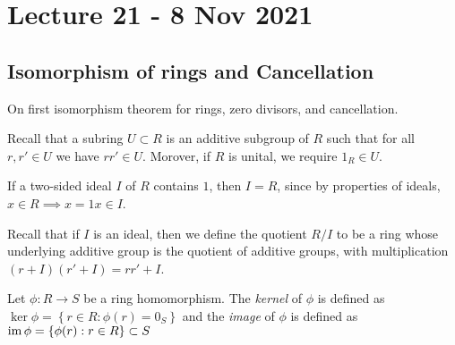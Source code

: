 \section{Lecture 21 - 8 Nov 2021}
\subsection{Isomorphism of rings and Cancellation}
On first isomorphism theorem for rings, zero divisors, and cancellation.

Recall that a subring $U\subset R$ is an additive subgroup of $R$ such that for all
$r,r'\in U$ we have $rr'\in U$. Morover, if $R$ is unital, we require $1_R\in U$. 


If a two-sided ideal $I$ of $R$ contains $1$, then $I = R$, since by properties of ideals, $x \in R \implies x = 1x \in I$. 

Recall that if $I$ is an ideal, then we define the quotient $R/I$ to be a ring whose
underlying additive group is the quotient of additive groups, with multiplication
$(r+I)(r'+I) = rr'+I$.

\begin{definition}
  Let $\phi:R\to S$ be a ring homomorphism. The \emph{kernel} of $\phi$ is defined as
  $\ker\phi=\left\{ r\in R : \phi(r)=0_S \right\}$ and the \emph{image} of $\phi$ is
  defined as $\operatorname{im}\phi=\left\{ \phi(r) : r\in R \right\}\subset S$
\end{definition}

